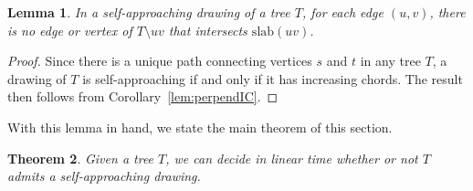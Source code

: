 \documentclass[11pt]{article}
\newcommand{\perpslab}[1]{\mathrm{slab}(#1)}
\newtheorem{theorem}{Theorem}
\newtheorem{lemma}[theorem]{Lemma}
\begin{document}
\begin{lemma}
\label{lem:treeStrip}
In a self-approaching drawing of a tree $T$, for each edge $(u,v)$, there is no edge or vertex of $T \setminus {uv}$ that intersects $\perpslab{uv}$.
\end{lemma}
\begin{proof}
Since there is a unique path connecting vertices $s$ and $t$ in any tree $T$, a drawing of $T$ is self-approaching if and only if it has increasing chords.  The result then follows from Corollary~\ref{lem:perpendIC}.
\end{proof}




With this lemma in hand, we state the main theorem of this section.

\begin{theorem}
\label{thm:drawableTrees}
Given a tree $T$, we can decide in linear time whether or not $T$ admits a self-approaching drawing.
\end{theorem}
\end{document}
